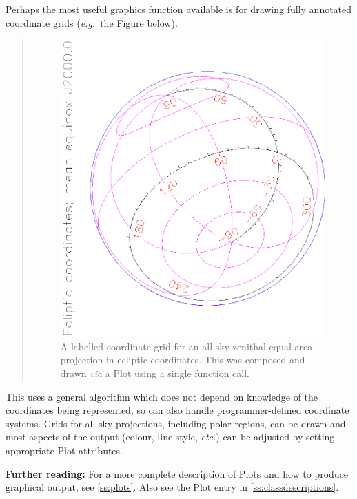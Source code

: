 \documentclass[twoside,11pt]{article}
\newcommand{\appref}[1]{Appendix~\ref{#1}}
\newcommand{\secref}[1]{\S\ref{#1}}
\renewcommand{\appref}[1]{\ref{#1}}
\renewcommand{\secref}[1]{\ref{#1}}
\begin{document}
\begin{htmlonly}
   Perhaps the most useful graphics function available is for drawing
   fully annotated coordinate grids ({\em{e.g.}}\ the Figure below).
   \begin{quote}
   \begin{figure}
   \label{fig:gridplot}
   \includegraphics[scale=1.2,angle=-90]{sun211_figures/gridplot.eps}
   \caption{A labelled coordinate grid for an all-sky zenithal equal area
   projection in ecliptic coordinates. This was composed and drawn
   {\em{via}} a Plot using a
   single function call.}
   \end{figure}
   \end{quote}
\end{htmlonly}
This uses a general algorithm which does not depend on knowledge of
the coordinates being represented, so can also handle
programmer-defined coordinate systems.  Grids for all-sky projections,
including polar regions, can be drawn and most aspects of the output
(colour, line style, {\em{etc.}}) can be adjusted by setting
appropriate Plot attributes.

{\bf{Further reading:}} For a more complete description of
Plots and how to produce graphical output, see \secref{ss:plots}. Also
see the Plot entry in \appref{ss:classdescriptions}.
\end{document}

